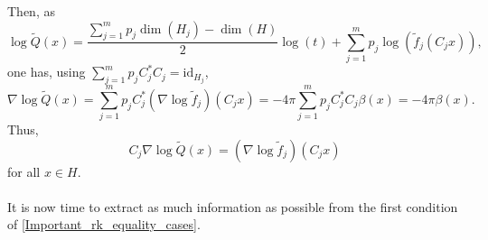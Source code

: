 \documentclass[11pt,a4paper,reqno]{amsart}
\numberwithin{equation}{section}
\theoremstyle{definition}
\renewcommand{\tilde}{\widetilde}
\newcommand{\<}{\ensuremath \leq}
\renewcommand{\>}{\ensuremath \geq}
\renewcommand{\tilde}{\widetilde}
\begin{document}
Then, as $$\log \tilde Q(x)=\frac{\sum_{j=1}^m p_j\dim(H_j)-\dim(H)}{2}\log(t)+\sum_{j=1}^m p_j\log (\tilde f_j(C_jx)),$$ one has, using $\sum_{j=1}^m p_jC_j^*C_j=\mathrm{id}_{H_j}$, $$\nabla \log \tilde Q(x)=\sum_{j=1}^m p_j C_j^*(\nabla \log \tilde f_j)(C_jx)=-4\pi \sum_{j=1}^m p_jC_j^*C_j\beta(x)=-4\pi \beta(x).$$ Thus, \begin{equation} \label{Fundamental_eq_equality_cases} C_j\nabla \log \tilde Q(x)=(\nabla \log \tilde f_j)(C_jx)\end{equation} for all $x \in H.$  
\hfill \\








\hfill \\


It is now time to extract as much information as possible from the first condition of \cref{Important_rk_equality_cases}. 
\end{document}
